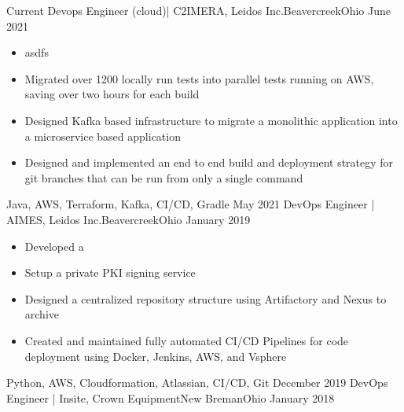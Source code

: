 %
%
%
\begin{experiences}

  \experience
    {Current}   {Devops Engineer (cloud)| C2IMERA, Leidos Inc.}{Beavercreek}{Ohio}
    {June 2021} {
                      \begin{itemize}
                        \item asdfs
                        \item Migrated over 1200 locally run tests into parallel tests running on AWS, saving over two hours for each build
                        \item Designed Kafka based infrastructure to migrate a monolithic application into a microservice based application
                        \item Designed and implemented an end to end build and deployment strategy for git branches that can be run from only a single command

                      \end{itemize}
                    }
                    {Java, AWS, Terraform, Kafka, CI/CD, Gradle}
  \emptySeparator
  \experience
    {May 2021}   {DevOps Engineer | AIMES, Leidos Inc.}{Beavercreek}{Ohio}
    {January 2019} {
                      \begin{itemize}
                          \item Developed a
                          \item Setup a private PKI signing service
                          \item Designed a centralized repository structure using Artifactory and Nexus to archive
                          \item Created and maintained fully automated CI/CD Pipelines for code deployment using Docker, Jenkins, AWS, and Vsphere
                      \end{itemize}
                    }
                    {Python, AWS, Cloudformation, Atlassian, CI/CD, Git}
  \emptySeparator
  \experience
    {December 2019}   {DevOps Engineer | Insite, Crown Equipment}{New Breman}{Ohio}
    {January 2018} {
                      \begin{itemize}
                        

\end{itemize}}
\end{experiences}

